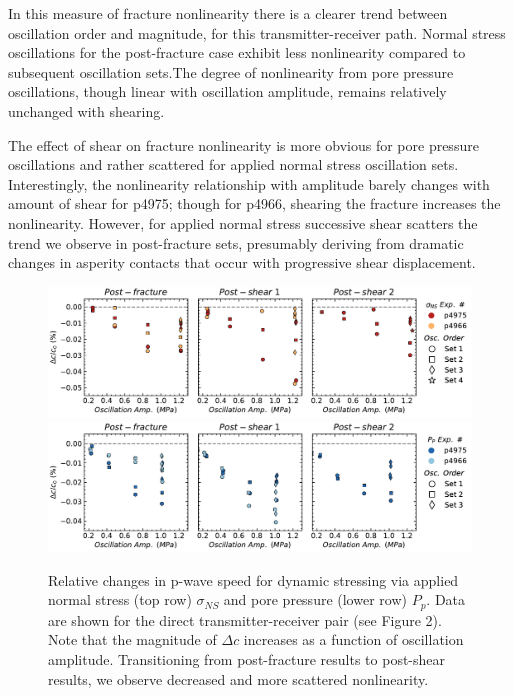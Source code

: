 \documentclass[letterpaper,10pt]{article}
\begin{document}
In this measure of fracture nonlinearity there is a clearer trend between oscillation order and magnitude, for this transmitter-receiver path. Normal stress oscillations for the post-fracture case exhibit less nonlinearity compared to  subsequent oscillation sets.The degree of nonlinearity from pore pressure oscillations, though linear with oscillation amplitude, remains relatively unchanged with shearing. 

The effect of shear on fracture nonlinearity is more obvious for pore pressure oscillations and rather scattered for applied normal stress oscillation sets. Interestingly, the nonlinearity relationship with amplitude barely changes with amount of shear for p4975; though for p4966,  shearing the fracture increases the nonlinearity. However, for applied normal stress successive shear scatters the trend we observe in post-fracture sets, presumably deriving from dramatic changes in asperity contacts that occur with progressive shear displacement.

\clearpage

\begin{figure}[ht]
	\centering
	\includegraphics[width=1\columnwidth]{delc_amp_NS}
	\includegraphics[width=1\columnwidth]{delc_amp_PP}
	\caption{ Relative changes in p-wave speed for dynamic stressing via applied normal stress (top row)  $ \sigma_{NS} $ and pore pressure (lower row) $ P_p $. Data are shown for the direct transmitter-receiver pair (see Figure 2). Note that the magnitude of $ \Delta c $  increases as a function of oscillation amplitude. Transitioning from post-fracture results to post-shear results, we observe decreased and more scattered nonlinearity.}%
	\label{fig:delc_ns_amp}
\end{figure}
\end{document}
